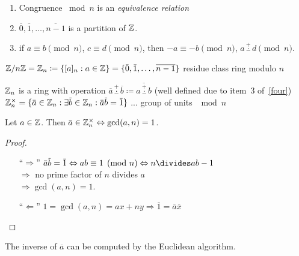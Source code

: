 \documentclass[NumTh.tex]{subfiles}
\begin{document}
\begin{rem}
\label{four}
\begin{enumerate}
  \item Congruence $\bmod{n}$ is an \emph{equivalence relation}
  \item $\overbar{0},\overbar{1},\dots,\overline{n-1}$ is a partition of $\mathbb{Z}$.
  \item if $a \equiv b \pmod{n}$, $c \equiv d \pmod{n}$, then 
  $-a \equiv -b \pmod{n}$,
  $a \overset{+}{\underset{-}{\cdot}} d \pmod{n}$.
\end{enumerate}
\end{rem}

\begin{defi}
$\Z / n\Z = \Z_n \coloneq \{[a]_n : a\in \Z\} = \{\overbar{0},\overbar{1},\dots,\overline{n-1}\}$ residue class ring modulo $n$
\end{defi}

\begin{rem}
$\mathbb{Z}_n$ is a ring with operation $\overbar{a} \overset{+}{\underset{-}{\cdot}} \overbar{b} \coloneq \overline{a\overset{+}{\underset{-}{\cdot}}b}$ (well defined due to item~3 of~\cref{four})
$\Z_n^\times = \{ \overbar{a} \in \Z_n : \exists \overbar{b} \in \Z_n : \overbar{a}\overbar{b} = \overbar{1} \}$ ... group of units $\mod n$
\end{rem}

\begin{lemma}
Let $a \in \mathbb{Z}$. Then $\overbar{a} \in \Z_n^\times \Leftrightarrow \gcd(a,n) = 1$.
\end{lemma}

\begin{proof}\hfill
\begin{itemize}
  \item[``$\Rightarrow$'']
    $\overbar{a}\overbar{b} = \overbar{1} \Leftrightarrow ab \equiv 1 \pmod{n} \Leftrightarrow n\divides ab-1$ \\
    $\Rightarrow$ no prime factor of $n$ divides $a$ \\
    $\Rightarrow \gcd(a,n) =1$.
  \item[``$\Leftarrow$'']
    $1 = \gcd(a,n) = ax + ny \Rightarrow \overbar{1} = \overbar{a}\overbar{x}$
\end{itemize}
\end{proof}

\begin{rem}
The inverse of $\overbar{a}$ can be computed by the Euclidean algorithm.
\end{rem}
\end{document}
